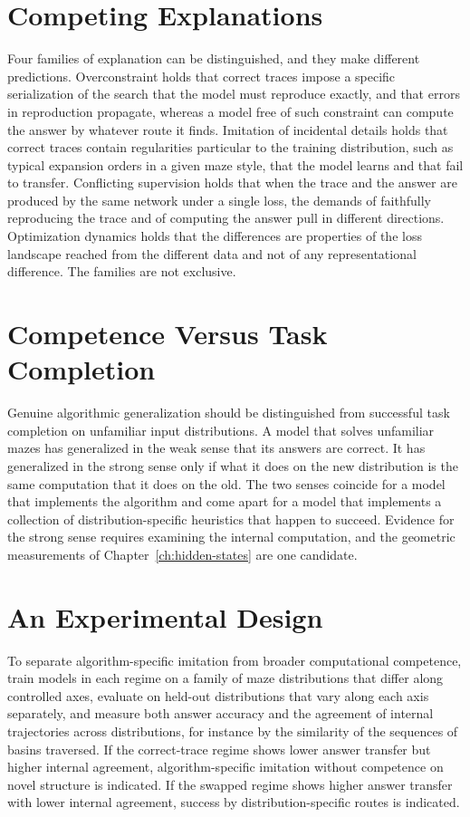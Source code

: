 \section{Competing Explanations}

Four families of explanation can be distinguished, and they make different predictions. Overconstraint holds that correct traces impose a specific serialization of the search that the model must reproduce exactly, and that errors in reproduction propagate, whereas a model free of such constraint can compute the answer by whatever route it finds. Imitation of incidental details holds that correct traces contain regularities particular to the training distribution, such as typical expansion orders in a given maze style, that the model learns and that fail to transfer. Conflicting supervision holds that when the trace and the answer are produced by the same network under a single loss, the demands of faithfully reproducing the trace and of computing the answer pull in different directions. Optimization dynamics holds that the differences are properties of the loss landscape reached from the different data and not of any representational difference. The families are not exclusive.

\section{Competence Versus Task Completion}

Genuine algorithmic generalization should be distinguished from successful task completion on unfamiliar input distributions. A model that solves unfamiliar mazes has generalized in the weak sense that its answers are correct. It has generalized in the strong sense only if what it does on the new distribution is the same computation that it does on the old. The two senses coincide for a model that implements the algorithm and come apart for a model that implements a collection of distribution-specific heuristics that happen to succeed. Evidence for the strong sense requires examining the internal computation, and the geometric measurements of Chapter~\ref{ch:hidden-states} are one candidate.

\section{An Experimental Design}

To separate algorithm-specific imitation from broader computational competence, train models in each regime on a family of maze distributions that differ along controlled axes, evaluate on held-out distributions that vary along each axis separately, and measure both answer accuracy and the agreement of internal trajectories across distributions, for instance by the similarity of the sequences of basins traversed. If the correct-trace regime shows lower answer transfer but higher internal agreement, algorithm-specific imitation without competence on novel structure is indicated. If the swapped regime shows higher answer transfer with lower internal agreement, success by distribution-specific routes is indicated.

